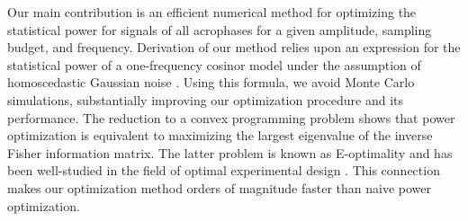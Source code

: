 \documentclass{article}
\begin{document}
Our main contribution is an efficient numerical method for optimizing the statistical power for signals of all acrophases  for a given amplitude, sampling budget, and frequency. Derivation of our method relies upon an expression for the statistical power of a one-frequency cosinor model under the assumption of homoscedastic Gaussian noise \cite{wei2023circpower}. Using this formula, we avoid Monte Carlo simulations, substantially improving our optimization procedure and its performance.  The reduction to a convex programming problem shows that power optimization is equivalent to maximizing the largest eigenvalue of the inverse Fisher information matrix. The latter problem is known as E-optimality and has been well-studied in the field of optimal experimental design \cite{pukelsheim1993,oed2,oed3}. This connection makes our  optimization method orders of magnitude faster than naive power optimization. 


\end{document}
